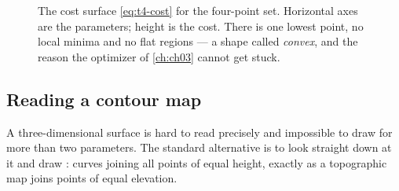 \begin{figure}[htbp]
  \centering
  \caption{The cost surface \cref{eq:t4-cost} for the four-point set. Horizontal
  axes are the parameters; height is the cost. There is one lowest point, no
  local minima and no flat regions --- a shape called \emph{convex}, and the
  reason the optimizer of \cref{ch:ch03} cannot get stuck.}
  \label{fig:bowl}
\end{figure}

\subsection{Reading a contour map}
\label{sec:contours}

A three-dimensional surface is hard to read precisely and impossible to draw for
more than two parameters. The standard alternative is to look straight down at
it and draw : curves joining all points of equal height, exactly
as a topographic map joins points of equal elevation.

